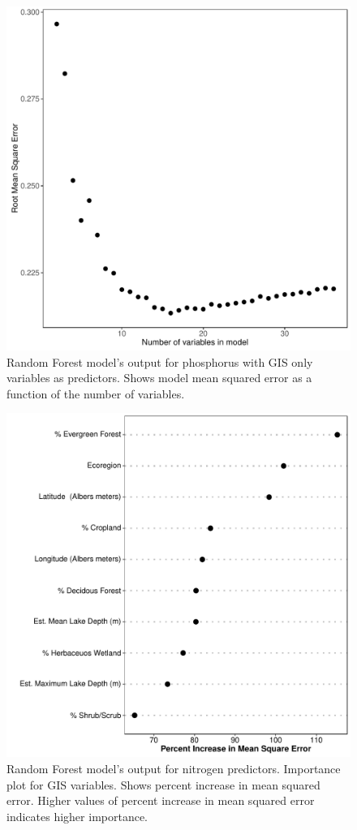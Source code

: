 \documentclass[fleqn,10pt,lineno]{wlpeerj} %
\begin{document}
\begin{figure}
  \includegraphics[scale=0.5]{gis_vs_PTL.pdf}
  \caption{Random Forest model's output for phosphorus with GIS only variables as predictors. Shows model mean squared error as a function of the number of variables.}
  \label{fig:gis_vs_PTL}
\end{figure}

\begin{figure}
  \includegraphics[width=\textwidth]{importanceplot_gis_NTL.pdf}
  \caption{Random Forest model's output for nitrogen predictors. Importance plot for GIS variables. Shows percent increase in mean squared error. Higher values of percent increase in mean squared error indicates higher importance.}
  \label{fig:importancePlot_gis_NTL}
\end{figure}
\end{document}
